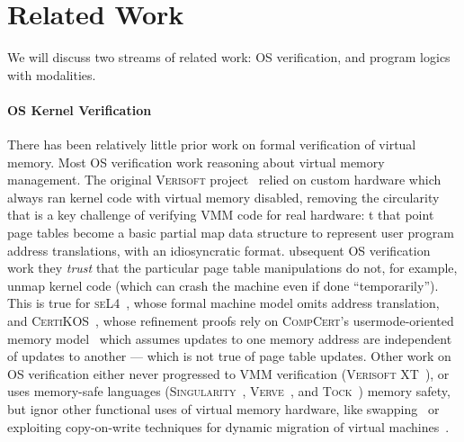 \section{Related Work}
\label{sec:relwork}
We will discuss two streams of related work: OS verification, and 
program logics with modalities.

\paragraph{OS Kernel Verification}
There has been relatively little prior work on formal verification of virtual memory.
Most OS verification work  reasoning about virtual memory management.
The original \textsc{Verisoft} project~\cite{alkassar2008verisoft,alkassar2010pervasive,alkassar2008formal,dalinger2005verification,hillebrand2005address,alkassar2008formal,starostin2010formal} 
relied on custom hardware which always ran kernel code with virtual memory disabled, removing the circularity that is a key challenge of verifying
VMM code for real hardware: t that point page tables become a basic partial map data structure to represent user program address translations,
with an idiosyncratic format. ubsequent OS verification work
 they \emph{trust}
that the particular page table manipulations do not, for example, unmap kernel code
 (which can crash the machine even if done ``temporarily'').%
This is true for \textsc{seL4}~\cite{Klein2009seL4,seL4TOCS,Sewell2013translation}, whose formal machine model omits address translation,
and \textsc{CertiKOS}~\cite{gu15,gu2016certikos,gu2018certikos,chen2016interrupts}, whose refinement proofs rely on
\textsc{CompCert}'s usermode-oriented memory model~\cite{leroy2008formal,leroy2009formally} which assumes
updates to one memory address are independent of updates to another ---
which is not true of page table updates.
Other work on OS verification either never progressed to VMM verification
(\textsc{Verisoft XT}~\cite{cohen2009vcc,cohen2010local,dahlweid2009vcc,cohen2013SOFSEM}),
or uses memory-safe languages
(\textsc{Singularity}~\cite{Fahndrich2006language,Hunt2007singularity,Hunt2007sealing,Barnett2011specsharp}, \textsc{Verve}~\cite{Yang2010Verve},
and \textsc{Tock}~\cite{levy2017multiprogramming}) memory safety, but ignor other functional uses of virtual memory
hardware, like swapping~\cite{Denning1970VM} or exploiting copy-on-write techniques for dynamic migration of virtual machines~\cite{clark2005live}.

